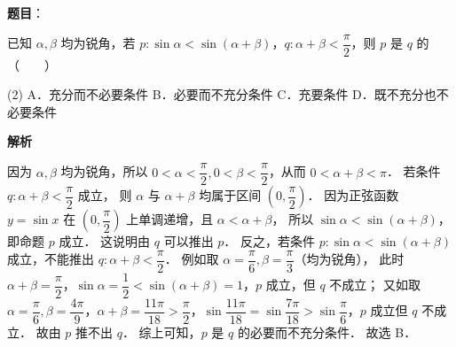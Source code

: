 \begin{answer}

\textbf{题目}：

已知 $\alpha, \beta$ 均为锐角，若 $p: \sin\alpha < \sin(\alpha + \beta)$，$q: \alpha + \beta < \dfrac{\pi}{2}$，则 $p$ 是 $q$ 的\mbox{（　　）}

\begin{gkopts}(2)
\task A．充分而不必要条件
\task B．必要而不充分条件
\task C．充要条件
\task D．既不充分也不必要条件
\end{gkopts}

\textbf{解析}

因为 $\alpha, \beta$ 均为锐角，所以 $0 < \alpha < \dfrac{\pi}{2}, 0 < \beta < \dfrac{\pi}{2}$，从而 $0 < \alpha + \beta < \pi$．
若条件 $q: \alpha + \beta < \dfrac{\pi}{2}$ 成立，
则 $\alpha$ 与 $\alpha + \beta$ 均属于区间 $\left(0, \dfrac{\pi}{2}\right)$．
因为正弦函数 $y = \sin x$ 在 $\left(0, \dfrac{\pi}{2}\right)$ 上单调递增，且 $\alpha < \alpha + \beta$，
所以 $\sin\alpha < \sin(\alpha + \beta)$，即命题 $p$ 成立．
这说明由 $q$ 可以推出 $p$．
反之，若条件 $p: \sin\alpha < \sin(\alpha + \beta)$ 成立，不能推出 $q: \alpha + \beta < \dfrac{\pi}{2}$．
例如取 $\alpha = \dfrac{\pi}{6}, \beta = \dfrac{\pi}{3}$（均为锐角），
此时 $\alpha + \beta = \dfrac{\pi}{2}$，$\sin\alpha = \dfrac{1}{2} < \sin(\alpha + \beta) = 1$，$p$ 成立，但 $q$ 不成立；
又如取 $\alpha = \dfrac{\pi}{6}, \beta = \dfrac{4\pi}{9}$，$\alpha + \beta = \dfrac{11\pi}{18} > \dfrac{\pi}{2}$，$\sin\dfrac{11\pi}{18} = \sin\dfrac{7\pi}{18} > \sin\dfrac{\pi}{6}$，$p$ 成立但 $q$ 不成立．
故由 $p$ 推不出 $q$．
综上可知，$p$ 是 $q$ 的必要而不充分条件．
故选 B．


\end{answer}
